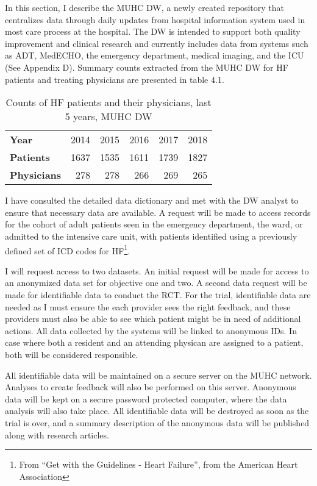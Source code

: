 In this section, I describe the MUHC \gls{DW}, a newly created repository that centralizes data through daily updates from hospital information system used in most care process at the hospital. The \gls{DW} is intended to support both quality improvement and clinical research and currently includes data from systems such as ADT, MedECHO, the emergency department, medical imaging, and the ICU (See Appendix D). Summary counts extracted from the MUHC DW for HF patients and treating physicians are presented in table 4.1.

\begin{table}[h!]
\centering
\begin{tabular}{l|rrrrr}
\textbf{Year}       & 2014 & 2015 & 2016 & 2017 & 2018   \\
\textbf{Patients}   & 1637 & 1535 & 1611 & 1739 & 1827 \\
\textbf{Physicians} & 278 & 278 & 266 & 269 & 265 
\end{tabular}
\caption{Counts of HF patients and their physicians, last 5 years, MUHC DW}
\label{tab:data}
\end{table}

I have consulted the detailed data dictionary and met with the DW analyst to ensure that necessary data are available. A request will be made to access records for the cohort of adult patients seen in the emergency department, the ward, or admitted to the intensive care unit, with patients identified using a previously defined set of ICD codes for HF\footnote{From ``Get with the Guidelines - Heart Failure'', from the American Heart Association}.

I will request access to two datasets. An initial request will be made for access to an anonymized data set for objective one and two. A second data request will be made for identifiable data to conduct the RCT. For the trial, identifiable data are needed as I must ensure the each provider sees the right feedback, and these providers must also be able to see which patient might be in need of additional actions. All data collected by the systems will be linked to anonymous IDs. In case where both a resident and an attending physican are assigned to a patient, both will be considered responsible.

All identifiable data will be maintained on a secure server on the MUHC network. Analyses to create feedback will also be performed on this server. Anonymous data will be kept on a secure password protected computer, where the data analysis will also take place. All identifiable data will be destroyed as soon as the trial is over, and a summary description of the anonymous data will be published along with research articles.

